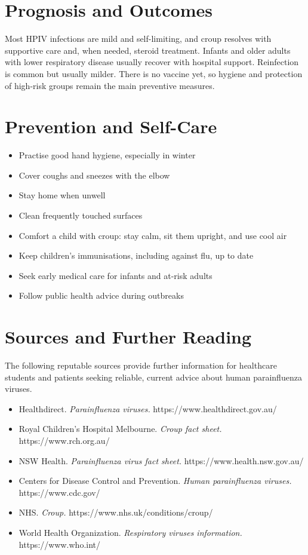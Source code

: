 \section*{Prognosis and Outcomes}
Most HPIV infections are mild and self-limiting, and croup resolves with supportive care and, when needed, steroid treatment. Infants and older adults with lower respiratory disease usually recover with hospital support. Reinfection is common but usually milder. There is no vaccine yet, so hygiene and protection of high-risk groups remain the main preventive measures.

\section*{Prevention and Self-Care}
\begin{itemize}
    \item Practise good hand hygiene, especially in winter
    \item Cover coughs and sneezes with the elbow
    \item Stay home when unwell
    \item Clean frequently touched surfaces
    \item Comfort a child with croup: stay calm, sit them upright, and use cool air
    \item Keep children's immunisations, including against flu, up to date
    \item Seek early medical care for infants and at-risk adults
    \item Follow public health advice during outbreaks
\end{itemize}

\section*{Sources and Further Reading}
The following reputable sources provide further information for healthcare students and patients seeking reliable, current advice about human parainfluenza viruses.

\begin{itemize}
    \item Healthdirect. \textit{Parainfluenza viruses.} https://www.healthdirect.gov.au/
    \item Royal Children's Hospital Melbourne. \textit{Croup fact sheet.} https://www.rch.org.au/
    \item NSW Health. \textit{Parainfluenza virus fact sheet.} https://www.health.nsw.gov.au/
    \item Centers for Disease Control and Prevention. \textit{Human parainfluenza viruses.} https://www.cdc.gov/
    \item NHS. \textit{Croup.} https://www.nhs.uk/conditions/croup/
    \item World Health Organization. \textit{Respiratory viruses information.} https://www.who.int/
\end{itemize}
